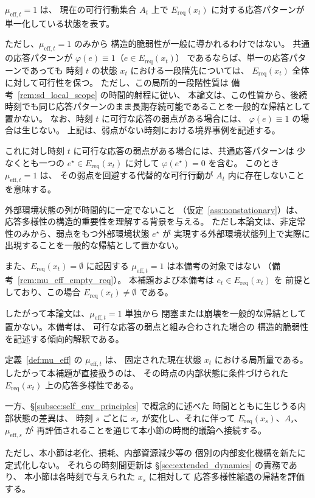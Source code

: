 \begin{remark}[$\mu_{\mathrm{eff},t}=1$ の構造的意味：傾向的解釈]
\label{rem:mu_eff_tendency}
$\mu_{\mathrm{eff},t}=1$ は、
現在の可行行動集合 $A_t$ 上で
$E_{\mathrm{req}}(x_t)$ に対する応答パターンが
単一化している状態を表す。

ただし、$\mu_{\mathrm{eff},t}=1$ のみから
構造的脆弱性が一般に導かれるわけではない。
共通の応答パターンが
$\varphi(e)\equiv1$（$e\in E_{\mathrm{req}}(x_t)$）
であるならば、単一の応答パターンであっても
時刻 $t$ の状態 $x_t$ における一段階先については、
$E_{\mathrm{req}}(x_t)$ 全体に対して可行性を保つ。
ただし、この局所的一段階性質は
備考~\ref{rem:sd_local_scope} の時間的射程に従い、
本論文は、この性質から、後続時刻でも同じ応答パターンのまま長期存続可能であることを一般的な帰結として置かない。
なお、時刻 $t$ に可行な応答の弱点がある場合には、
$\varphi(e)\equiv1$ の場合は生じない。
上記は、弱点がない時刻における境界事例を記述する。

これに対し時刻 $t$ に可行な応答の弱点がある場合には、共通応答パターンは
少なくとも一つの $e^\star\in E_{\mathrm{req}}(x_t)$ に対して
$\varphi(e^\star)=0$ を含む。
このとき $\mu_{\mathrm{eff},t}=1$ は、
その弱点を回避する代替的な可行行動が
$A_t$ 内に存在しないことを意味する。

外部環境状態の列が時間的に一定でないこと
（仮定~\ref{ass:nonstationary}）は、
応答多様性の構造的重要性を理解する背景を与える。
ただし本論文は、非定常性のみから、弱点をもつ外部環境状態 $e^\star$ が
実現する外部環境状態列上で実際に出現することを一般的な帰結として置かない。

また、$E_{\mathrm{req}}(x_t)=\emptyset$ に起因する
$\mu_{\mathrm{eff},t}=1$ は本備考の対象ではない
（備考~\ref{rem:mu_eff_empty_req}）。
本補題および本備考は $e_t\in E_{\mathrm{req}}(x_t)$ を
前提としており、この場合 $E_{\mathrm{req}}(x_t)\neq\emptyset$ である。

したがって本論文は、$\mu_{\mathrm{eff},t}=1$ 単独から
閉塞または崩壊を一般的な帰結として置かない。本備考は、
可行な応答の弱点と組み合わされた場合の
構造的脆弱性を記述する傾向的解釈である。
\end{remark}

\begin{remark}[内部状態差と本小節の時間的射程]
\label{rem:sd_internal_state_scope}
定義~\ref{def:mu_eff} の $\mu_{\mathrm{eff},t}$ は、
固定された現在状態 $x_t$ における局所量である。
したがって本補題が直接扱うのは、
その時点の内部状態に条件づけられた
$E_{\mathrm{req}}(x_t)$ 上の応答多様性である。

一方、\S\ref{subsec:self_env_principles} で概念的に述べた
時間とともに生じうる内部状態の差異は、
時刻 $s$ ごとに $x_s$ が変化し、それに伴って
$E_{\mathrm{req}}(x_s)$、$A_s$、$\mu_{\mathrm{eff},s}$ が
再評価されることを通じて本小節の時間的議論へ接続する。

ただし、本小節は老化、損耗、内部資源減少等の
個別の内部変化機構を新たに定式化しない。
それらの時刻間更新は \S\ref{sec:extended_dynamics} の責務であり、
本小節は各時刻で与えられた $x_s$ に相対して
応答多様性縮退の帰結を評価する。
\end{remark}

